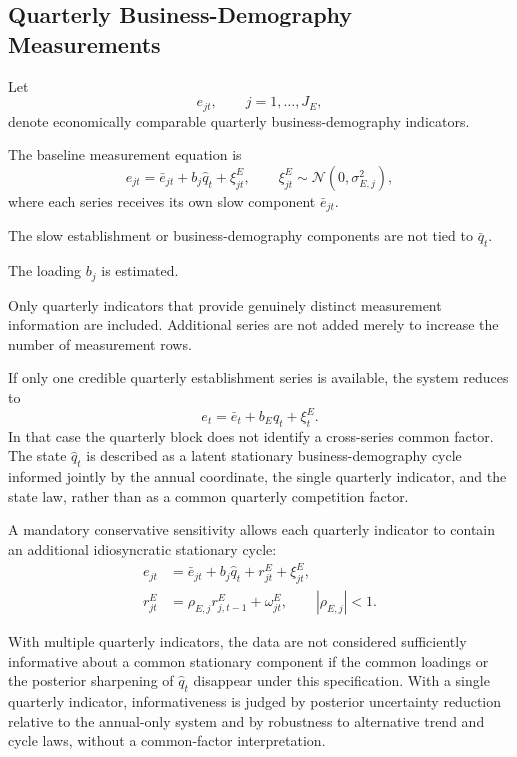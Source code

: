 \documentclass[11pt]{article}
\newcommand{\Normal}{\mathcal{N}}
\begin{document}
\subsection{Quarterly Business-Demography Measurements}

Let
\begin{equation}
e_{jt},
\qquad j=1,\ldots,J_E,
\end{equation}
denote economically comparable quarterly business-demography indicators.

The baseline measurement equation is
\begin{equation}
e_{jt}
=
\bar e_{jt}
+
b_j\hat q_t
+
\xi_{jt}^E,
\qquad
\xi_{jt}^E\sim\Normal(0,\sigma_{E,j}^2),
\label{eq:quarterly_measurement}
\end{equation}
where each series receives its own slow component \(\bar e_{jt}\).

The slow establishment or business-demography components are not tied to \(\bar q_t\).

The loading \(b_j\) is estimated.

Only quarterly indicators that provide genuinely distinct measurement information are included. Additional series are not added merely to increase the number of measurement rows.

If only one credible quarterly establishment series is available, the system reduces to
\begin{equation}
e_t
=
\bar e_t+b_E\hat q_t+\xi_t^E.
\end{equation}
In that case the quarterly block does not identify a cross-series common factor. The state \(\hat q_t\) is described as a latent stationary business-demography cycle informed jointly by the annual coordinate, the single quarterly indicator, and the state law, rather than as a common quarterly competition factor.

A mandatory conservative sensitivity allows each quarterly indicator to contain an additional idiosyncratic stationary cycle:
\begin{align}
e_{jt}
&=
\bar e_{jt}
+
b_j\hat q_t
+
r_{jt}^E
+
\xi_{jt}^E,\\
r_{jt}^E
&=
\rho_{E,j}r_{j,t-1}^E+\omega_{jt}^E,
\qquad |\rho_{E,j}|<1.
\end{align}

With multiple quarterly indicators, the data are not considered sufficiently informative about a common stationary component if the common loadings or the posterior sharpening of \(\hat q_t\) disappear under this specification. With a single quarterly indicator, informativeness is judged by posterior uncertainty reduction relative to the annual-only system and by robustness to alternative trend and cycle laws, without a common-factor interpretation.
\end{document}

